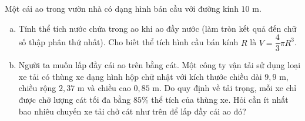 \begin{bt}%
Một cái ao trong vườn nhà có dạng hình bán cầu với đường kính $10\text{ m}$.
\begin{enumerate}[a)]
    \item Tính thể tích nước chứa trong ao khi ao đầy nước (làm tròn kết quả đến chữ số thập phân thứ nhất). Cho biết thể tích hình cầu bán kính $R$ là $V = \dfrac{4}{3}\pi R^3$.
    \item Người ta muốn lấp đầy cái ao trên bằng cát. Một công ty vận tải sử dụng loại xe tải có thùng xe dạng hình hộp chữ nhật với kích thước chiều dài $9{,}9\text{ m}$, chiều rộng $2{,}37\text{ m}$ và chiều cao $0{,}85\text{ m}$. Do quy định về tải trọng, mỗi xe chỉ được chở lượng cát tối đa bằng $85\%$ thể tích của thùng xe. Hỏi cần ít nhất bao nhiêu chuyến xe tải chở cát như trên để lấp đầy cái ao đó?
\end{enumerate}
\end{bt}

